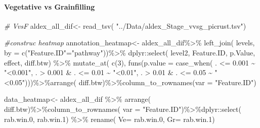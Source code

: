 \documentclass[]{interact}
\theoremstyle{plain}%
\theoremstyle{definition}
\theoremstyle{remark}
\newenvironment{Shaded}{\begin{snugshade}}{\end{snugshade}}
\newcommand{\AttributeTok}[1]{\textcolor[rgb]{0.77,0.63,0.00}{#1}}
\newcommand{\CommentTok}[1]{\textcolor[rgb]{0.56,0.35,0.01}{\textit{#1}}}
\newcommand{\DecValTok}[1]{\textcolor[rgb]{0.00,0.00,0.81}{#1}}
\newcommand{\FloatTok}[1]{\textcolor[rgb]{0.00,0.00,0.81}{#1}}
\newcommand{\FunctionTok}[1]{\textcolor[rgb]{0.00,0.00,0.00}{#1}}
\newcommand{\NormalTok}[1]{#1}
\newcommand{\OtherTok}[1]{\textcolor[rgb]{0.56,0.35,0.01}{#1}}
\newcommand{\SpecialCharTok}[1]{\textcolor[rgb]{0.00,0.00,0.00}{#1}}
\newcommand{\StringTok}[1]{\textcolor[rgb]{0.31,0.60,0.02}{#1}}
\begin{document}
\hypertarget{vegetative-vs-grainfilling}{%
\paragraph{Vegetative vs
Grainfilling}\label{vegetative-vs-grainfilling}}

\begin{Shaded}
\begin{Highlighting}[]
\CommentTok{\# VvsF}
\NormalTok{aldex\_all\_dif}\OtherTok{\textless{}{-}} \FunctionTok{read\_tsv}\NormalTok{( }\StringTok{"../Data/aldex\_Stage\_vvsg\_picrust.tsv"}\NormalTok{)}


\CommentTok{\#construc heatmap}
\NormalTok{annotation\_heatmap}\OtherTok{\textless{}{-}}\NormalTok{ aldex\_all\_dif}\SpecialCharTok{\%\textgreater{}\%} \FunctionTok{left\_join}\NormalTok{(}
\NormalTok{  levels, }\AttributeTok{by =} \FunctionTok{c}\NormalTok{(}\StringTok{"Feature.ID"}\OtherTok{=}\StringTok{"pathway"}\NormalTok{))}\SpecialCharTok{\%\textgreater{}\%}\NormalTok{ dplyr}\SpecialCharTok{::}\FunctionTok{select}\NormalTok{(}
\NormalTok{  level2, Feature.ID, p.Value, effect, diff.btw) }\SpecialCharTok{\%\textgreater{}\%} \FunctionTok{mutate\_at}\NormalTok{(}
    \FunctionTok{c}\NormalTok{(}\DecValTok{3}\NormalTok{), }\FunctionTok{funs}\NormalTok{(}\AttributeTok{p.value =} \FunctionTok{case\_when}\NormalTok{(}
\NormalTok{    . }\SpecialCharTok{\textless{}=} \FloatTok{0.001} \SpecialCharTok{\textasciitilde{}} \StringTok{"\textless{}0.001"}\NormalTok{,}
\NormalTok{    . }\SpecialCharTok{\textgreater{}}  \FloatTok{0.001} \SpecialCharTok{\&}\NormalTok{ .  }\SpecialCharTok{\textless{}=} \FloatTok{0.01} \SpecialCharTok{\textasciitilde{}} \StringTok{"\textless{}0.01"}\NormalTok{,}
\NormalTok{    . }\SpecialCharTok{\textgreater{}}  \FloatTok{0.01} \SpecialCharTok{\&}\NormalTok{ .  }\SpecialCharTok{\textless{}=} \FloatTok{0.05} \SpecialCharTok{\textasciitilde{}} \StringTok{"\textless{}0.05"}\NormalTok{)))}\SpecialCharTok{\%\textgreater{}\%}\FunctionTok{arrange}\NormalTok{(}
\NormalTok{      diff.btw)}\SpecialCharTok{\%\textgreater{}\%}\FunctionTok{column\_to\_rownames}\NormalTok{(}\AttributeTok{var =} \StringTok{"Feature.ID"}\NormalTok{)}

\NormalTok{data\_heatmap}\OtherTok{\textless{}{-}}\NormalTok{ aldex\_all\_dif }\SpecialCharTok{\%\textgreater{}\%} \FunctionTok{arrange}\NormalTok{(}
\NormalTok{  diff.btw)}\SpecialCharTok{\%\textgreater{}\%}\FunctionTok{column\_to\_rownames}\NormalTok{(}
  \AttributeTok{var =} \StringTok{"Feature.ID"}\NormalTok{)}\SpecialCharTok{\%\textgreater{}\%}\NormalTok{dplyr}\SpecialCharTok{::}\FunctionTok{select}\NormalTok{(}
\NormalTok{    rab.win}\FloatTok{.0}\NormalTok{, rab.win}\FloatTok{.1}\NormalTok{) }\SpecialCharTok{\%\textgreater{}\%}  \FunctionTok{rename}\NormalTok{(}
  \AttributeTok{Ve=}\NormalTok{ rab.win}\FloatTok{.0}\NormalTok{, }\AttributeTok{Gr=}\NormalTok{ rab.win}\FloatTok{.1}\NormalTok{)}


\end{Highlighting}
\end{Shaded}
\end{document}
